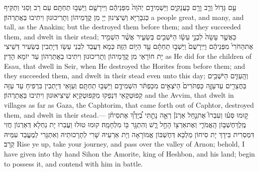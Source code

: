 {עַ֣ם גָּד֥וֹל וְרַ֛ב וָרָ֖ם כָּעֲנָקִ֑ים וַיַּשְׁמִידֵ֤ם יְהֹוָה֙ מִפְּנֵיהֶ֔ם וַיִּירָשֻׁ֖ם וַיֵּשְׁב֥וּ תַחְתָּֽם׃}
{עַם רַב וְסַגִּי וְתַקִּיף כְּגִבָּרַיָּא וְשֵׁיצִינוּן יְיָ מִן קֳדָמֵיהוֹן וְתָרִיכוּנוּן וִיתִיבוּ בַּאֲתַרְהוֹן׃}
{a people great, and many, and tall, as the Anakim; but the \lord\space destroyed them before them; and they succeeded them, and dwelt in their stead;}{}
{כַּאֲשֶׁ֤ר עָשָׂה֙ לִבְנֵ֣י עֵשָׂ֔ו הַיֹּשְׁבִ֖ים בְּשֵׂעִ֑יר אֲשֶׁ֨ר הִשְׁמִ֤יד אֶת\maqqaf הַחֹרִי֙ מִפְּנֵיהֶ֔ם וַיִּֽירָשֻׁם֙ וַיֵּשְׁב֣וּ תַחְתָּ֔ם עַ֖ד הַיּ֥וֹם הַזֶּֽה׃}
{כְּמָא דַּעֲבַד לִבְנֵי עֵשָׂו דְּיָתְבִין בְּשֵׂעִיר דְּשֵׁיצִי יָת חוֹרָאֵי מִן קֳדָמֵיהוֹן וְתָרִיכוּנוּן וִיתִיבוּ בַאֲתַרְהוֹן עַד יוֹמָא הָדֵין׃}
{as He did for the children of Esau, that dwell in Seir, when He destroyed the Horites from before them; and they succeeded them, and dwelt in their stead even unto this day;}{}
{וְהָֽעַוִּ֛ים הַיֹּשְׁבִ֥ים בַּחֲצֵרִ֖ים עַד\maqqaf עַזָּ֑ה כַּפְתֹּרִים֙ הַיֹּצְאִ֣ים מִכַּפְתֹּ֔ר הִשְׁמִידֻ֖ם וַיֵּשְׁב֥וּ תַחְתָּֽם׃}
{וְעַוָּאֵי דְּיָתְבִין בִּרְפִיחַ עַד עַזָּה קְפוּטְקָאֵי דִּנְפַקוּ מִקְּפוּטְקְיָא שֵׁיצִיאוּנוּן וִיתִיבוּ בַּאֲתַרְהוֹן׃}
{and the Avvim, that dwelt in villages as far as Gaza, the Caphtorim, that came forth out of Caphtor, destroyed them, and dwelt in their stead.—}{}
{ק֣וּמוּ סְּע֗וּ וְעִבְרוּ֮ אֶת\maqqaf נַ֣חַל אַרְנֹן֒ רְאֵ֣ה נָתַ֣תִּי בְ֠יָדְךָ֠ אֶת\maqqaf סִיחֹ֨ן מֶֽלֶךְ\maqqaf חֶשְׁבּ֧וֹן הָֽאֱמֹרִ֛י וְאֶת\maqqaf אַרְצ֖וֹ הָחֵ֣ל רָ֑שׁ וְהִתְגָּ֥ר בּ֖וֹ מִלְחָמָֽה׃}
{קוּמוּ טוּלוּ וַעֲבַרוּ יָת נַחְלָא דְּאַרְנוֹן חֲזִי דִּמְסַרִית בִּידָךְ יָת סִיחוֹן מַלְכָּא דְּחֶשְׁבּוֹן אֱמוֹרָאָה וְיָת אַרְעֵיהּ שָׁרִי לְתָרָכוּתֵיהּ וְאִתְגָּרִי לְמֶעֱבַד עִמֵּיהּ קְרָב׃}
{Rise ye up, take your journey, and pass over the valley of Arnon; behold, I have given into thy hand Sihon the Amorite, king of Heshbon, and his land; begin to possess it, and contend with him in battle.}{}
